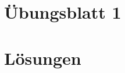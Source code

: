 \documentclass[a4paper,12pt]{scrartcl}
\newcommand*{\RootPath}{.}
\begin{document}
\section{Übungsblatt 1} 


 

\newpage
\section{Lösungen}
\printsolutions 
\end{document}
